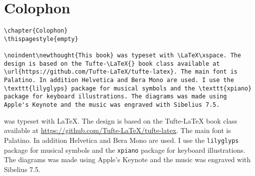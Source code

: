 
\chapter{Colophon}
\thispagestyle{empty}

\begin{fullwidth}

\begin{lstlisting}
\chapter{Colophon} 
\thispagestyle{empty}

\noindent\newthought{This book} was typeset with \LaTeX\xspace. The design is based on the Tufte-\LaTeX{} book class available at \url{https://github.com/Tufte-LaTeX/tufte-latex}. The main font is Palatino. In addition Helvetica and Bera Mono are used. I use the \texttt{lilyglyps} package for musical symbols and the \texttt{xpiano} package for keyboard illustrations. The diagrams was made using Apple's Keynote and the music was engraved with Sibelius 7.5.

\end{lstlisting}

\noindent{} was typeset with \LaTeX\xspace. The design is based on the Tufte-\LaTeX{} book class available at \url{https://github.com/Tufte-LaTeX/tufte-latex}. The main font is Palatino. In addition Helvetica and Bera Mono are used. I use the \texttt{lilyglyps} package for musical symbols and the \texttt{xpiano} package for keyboard illustrations. The diagrams was made using Apple's Keynote and the music was engraved with Sibelius 7.5.

\end{fullwidth}


